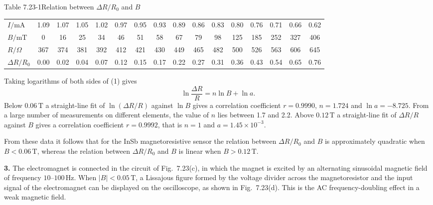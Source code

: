 \begin{center}
{\small Table 7.23-1\quad Relation between $\Delta R/R_0$ and $B$}\\[2pt]
{\footnotesize
\setlength{\tabcolsep}{4pt}
\begin{tabular}{@{}l*{15}{c}@{}}
\toprule
$I/\mathrm{mA}$ & 1.09 & 1.07 & 1.05 & 1.02 & 0.97 & 0.95 & 0.93 & 0.89 & 0.86 & 0.83 & 0.80 & 0.76 & 0.71 & 0.66 & 0.62\\
$B/\mathrm{mT}$ & 0 & 16 & 25 & 34 & 46 & 51 & 58 & 67 & 79 & 98 & 125 & 185 & 252 & 327 & 406\\
$R/\Omega$ & 367 & 374 & 381 & 392 & 412 & 421 & 430 & 449 & 465 & 482 & 500 & 526 & 563 & 606 & 645\\
$\Delta R/R_0$ & 0.00 & 0.02 & 0.04 & 0.07 & 0.12 & 0.15 & 0.17 & 0.22 & 0.27 & 0.31 & 0.36 & 0.43 & 0.54 & 0.65 & 0.76\\
\bottomrule
\end{tabular}}
\end{center}

Taking logarithms of both sides of (1) gives
\begin{equation}
\ln\frac{\Delta R}{R}=n\ln B+\ln a. \tag{2}
\end{equation}
Below $0.06\,\mathrm{T}$ a straight-line fit of $\ln(\Delta R/R)$ against $\ln B$ gives a correlation coefficient $r=0.9990$, $n=1.724$ and $\ln a=-8.725$. From a large number of measurements on different elements, the value of $n$ lies between 1.7 and 2.2. Above $0.12\,\mathrm{T}$ a straight-line fit of $\Delta R/R$ against $B$ gives a correlation coefficient $r=0.9992$, that is $n=1$ and $a=1.45\times10^{-3}$.

From these data it follows that for the InSb magnetoresistive sensor the relation between $\Delta R/R_0$ and $B$ is approximately quadratic when $B<0.06\,\mathrm{T}$, whereas the relation between $\Delta R/R_0$ and $B$ is linear when $B>0.12\,\mathrm{T}$.



\textbf{3.} The electromagnet is connected in the circuit of Fig.~7.23(c), in which the magnet is excited by an alternating sinusoidal magnetic field of frequency $10$--$100\,\mathrm{Hz}$. When $|B|<0.05\,\mathrm{T}$, a Lissajous figure formed by the voltage divider across the magnetoresistor and the input signal of the electromagnet can be displayed on the oscilloscope, as shown in Fig.~7.23(d). This is the AC frequency-doubling effect in a weak magnetic field.

